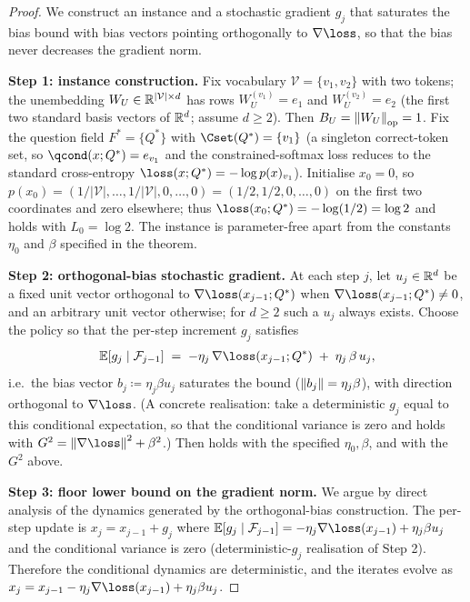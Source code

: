 \begin{proof}
We construct an instance and a stochastic gradient $g_j$ that saturates
the bias bound  with bias vectors pointing
orthogonally to $\nabla \loss$, so that the bias never decreases the
gradient norm.

\noindent\textbf{Step 1: instance construction.}
Fix vocabulary $\mathcal V = \{v_1, v_2\}$ with two tokens; the
unembedding $W_U \in \mathbb{R}^{|\mathcal V| \times d}$ has rows
$W_U^{(v_1)} = e_1$ and $W_U^{(v_2)} = e_2$ (the first two standard
basis vectors of $\mathbb{R}^d$; assume $d \ge 2$). Then
$B_U = \left\| W_U \right\|_{\mathrm{op}} = 1$.
Fix the question field $F^* = \{Q^*\}$ with $\Cset(Q^*) = \{v_1\}$ (a
singleton correct-token set, so $\qcond(x; Q^*) = e_{v_1}$ and the
constrained-softmax loss reduces to the standard cross-entropy
$\loss(x; Q^*) = -\log p(x)_{v_1}$). Initialise $x_0 = 0$, so
$p(x_0) = (1/|\mathcal V|, \dots, 1/|\mathcal V|, 0, \dots, 0) = (1/2, 1/2, 0, \dots, 0)$
on the first two coordinates and zero elsewhere; thus
$\loss(x_0; Q^*) = -\log(1/2) = \log 2$ and 
holds with $L_0 = \log 2$.
The instance is parameter-free apart from the constants $\eta_0$ and
$\beta$ specified in the theorem.

\noindent\textbf{Step 2: orthogonal-bias stochastic gradient.}
At each step $j$, let $u_j \in \mathbb{R}^d$ be a fixed unit vector orthogonal
to $\nabla \loss(x_{j-1}; Q^*)$ when
$\nabla \loss(x_{j-1}; Q^*) \neq 0$, and an arbitrary unit vector
otherwise; for $d \ge 2$ such a $u_j$ always exists. Choose the policy
so that the per-step increment $g_j$ satisfies
\begin{align*}
   \E[g_j \mid \mathcal F_{j-1}]
   \;=\;
   -\eta_j\, \nabla \loss(x_{j-1}; Q^*)
   \;+\; \eta_j\, \beta\, u_j,
\end{align*}
i.e.\ the bias vector $b_j \coloneqq \eta_j \beta u_j$ saturates the
bound  ($\left\| b_j \right\| = \eta_j \beta$), with
direction orthogonal to $\nabla \loss$. (A concrete realisation: take a
deterministic $g_j$ equal to this conditional expectation, so that the
conditional variance is zero and  holds
with $G^2 = \norm{\nabla \loss}^2 + \beta^2$.) Then
 holds with the specified
$\eta_0, \beta$, and  with the
$G^2$ above.

\noindent\textbf{Step 3: floor lower bound on the gradient norm.}
We argue by direct analysis of the dynamics generated by the
orthogonal-bias construction. The per-step update is
$x_j = x_{j-1} + g_j$ where
$\E[g_j \mid \mathcal F_{j-1}] = -\eta_j \nabla \loss(x_{j-1}) + \eta_j \beta u_j$
and the conditional variance is zero (deterministic-$g_j$ realisation
of Step 2). Therefore the conditional dynamics are deterministic, and
the iterates evolve as $x_j = x_{j-1} - \eta_j \nabla \loss(x_{j-1}) + \eta_j \beta u_j$.


\end{proof}
